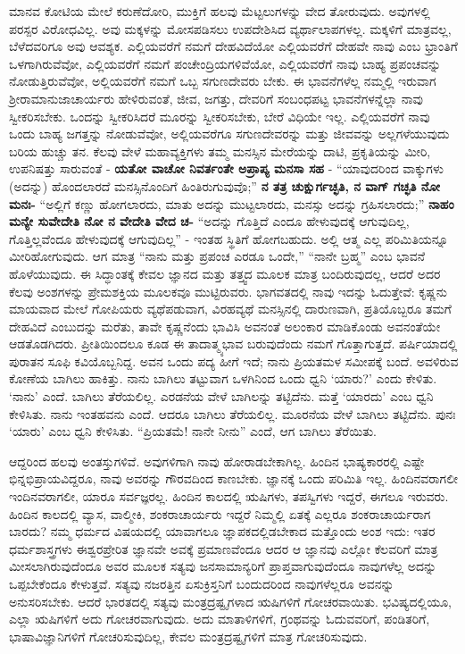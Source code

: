 ಮಾನವ ಕೋಟಿಯ ಮೇಲೆ ಕರುಣೆದೋರಿ, ಮುಕ್ತಿಗೆ ಹಲವು ಮೆಟ್ಟಲುಗಳನ್ನು ವೇದ ತೋರುವುದು. ಅವುಗಳಲ್ಲಿ ಪರಸ್ಪರ ವಿರೋಧವಿಲ್ಲ. ಅವು ಮಕ್ಕಳನ್ನು ಮೋಸಪಡಿಸಲು ಉಪದೇಶಿಸಿದ ವ್ಯರ್ಥಾಲಾಪಗಳಲ್ಲ. ಮಕ್ಕಳಿಗೆ ಮಾತ್ರವಲ್ಲ, ಬೆಳೆದವರಿಗೂ ಅವು ಆವಶ್ಯಕ. ಎಲ್ಲಿಯವರೆಗೆ ನಮಗೆ ದೇಹವಿದೆಯೋ ಎಲ್ಲಿಯವರೆಗೆ ದೇಹವೇ ನಾವು ಎಂಬ ಭ್ರಾಂತಿಗೆ ಒಳಗಾಗಿರುವೆವೋ, ಎಲ್ಲಿಯವರೆಗೆ ನಮಗೆ ಪಂಚೇಂದ್ರಿಯಗಳಿವೆಯೋ, ಎಲ್ಲಿಯವರೆಗೆ ನಾವು ಬಾಹ್ಯ ಪ್ರಪಂಚವನ್ನು ನೋಡುತ್ತಿರುವೆವೋ, ಅಲ್ಲಿಯವರೆಗೆ ನಮಗೆ ಒಬ್ಬ ಸಗುಣದೇವರು ಬೇಕು. ಈ ಭಾವನೆಗಳೆಲ್ಲ ನಮ್ಮಲ್ಲಿ ಇರುವಾಗ ಶ‍್ರೀರಾಮಾನುಜಾಚಾರ್ಯರು ಹೇಳಿರುವಂತೆ, ಜೀವ, ಜಗತ್ತು, ದೇವರಿಗೆ ಸಂಬಂಧಪಟ್ಟ ಭಾವನೆಗಳನ್ನೆಲ್ಲಾ ನಾವು ಸ್ವೀಕರಿಸಬೇಕು. ಒಂದನ್ನು ಸ್ವೀಕರಿಸಿದರೆ ಮೂರನ್ನು ಸ್ವೀಕರಿಸಬೇಕು, ಬೇರೆ ವಿಧಿಯೇ ಇಲ್ಲ. ಎಲ್ಲಿಯವರೆಗೆ ನಾವು ಒಂದು ಬಾಹ್ಯ ಜಗತ್ತನ್ನು ನೋಡುವೆವೋ, ಅಲ್ಲಿಯವರೆಗೂ ಸಗುಣದೇವರನ್ನು ಮತ್ತು ಜೀವವನ್ನು ಅಲ್ಲಗಳೆಯುವುದು ಬರಿಯ ಹುಚ್ಚು ತನ. ಕೆಲವು ವೇಳೆ ಮಹಾವ್ಯಕ್ತಿಗಳು ತಮ್ಮ ಮನಸ್ಸಿನ ಮೇರೆಯನ್ನು ದಾಟಿ, ಪ್ರಕೃತಿಯನ್ನು ಮೀರಿ, ಉಪನಿಷತ್ತು ಸಾರುವಂತೆ - \textbf{ಯತೋ ವಾಚೋ ನಿವರ್ತಂತೇ ಅಪ್ರಾಪ್ಯ ಮನಸಾ ಸಹ} - “ಯಾವುದರಿಂದ ವಾಕ್ಕುಗಳು (ಅದನ್ನು) ಹೊಂದಲಾರದೆ ಮನಸ್ಸಿನೊಂದಿಗೆ ಹಿಂತಿರುಗುವುವೊ;” \textbf{ನ ತತ್ರ ಚುಕ್ಷುರ್ಗಚ್ಛತಿ, ನ ವಾಗ್​ ಗಚ್ಛತಿ ನೋ ಮನಃ-} “ಅಲ್ಲಿಗೆ ಕಣ್ಣು ಹೋಗಲಾರದು, ಮಾತು ಅದನ್ನು ಮುಟ್ಟಲಾರದು, ಮನಸ್ಸು ಅದನ್ನು ಗ್ರಹಿಸಲಾರದು;” \textbf{ನಾಹಂ ಮನ್ಯೇ ಸುವೇದೇತಿ ನೋ ನ ವೇದೇತಿ ವೇದ ಚ-} “ಅದನ್ನು ಗೊತ್ತಿದೆ ಎಂದೂ ಹೇಳುವುದಕ್ಕೆ ಆಗುವುದಿಲ್ಲ, ಗೊತ್ತಿಲ್ಲವೆಂದೂ ಹೇಳುವುದಕ್ಕೆ ಆಗುವುದಿಲ್ಲ” - ಇಂತಹ ಸ್ಥಿತಿಗೆ ಹೋಗಬಹುದು. ಅಲ್ಲಿ ಆತ್ಮ ಎಲ್ಲ ಪರಿಮಿತಿಯನ್ನೂ ಮೀರಿಹೋಗುವುದು. ಆಗ ಮಾತ್ರ “ನಾನು ಮತ್ತು ಪ್ರಪಂಚ ಎರಡೂ ಒಂದೇ,” “ನಾನೇ ಬ್ರಹ್ಮ” ಎಂಬ ಭಾವನೆ ಹೊಳೆಯುವುದು. ಈ ಸಿದ್ಧಾಂತಕ್ಕೆ ಕೇವಲ ಜ್ಞಾನದ ಮತ್ತು ತತ್ತ್ವದ ಮೂಲಕ ಮಾತ್ರ ಬಂದಿರುವುದಲ್ಲ, ಆದರೆ ಅದರ ಕೆಲವು ಅಂಶಗಳನ್ನು ಪ್ರೇಮಶಕ್ತಿಯ ಮೂಲಕವೂ ಮುಟ್ಟಿರುವರು. ಭಾಗವತದಲ್ಲಿ ನಾವು ಇದನ್ನು ಓದುತ್ತೇವೆ: ಕೃಷ್ಣನು ಮಾಯವಾದ ಮೇಲೆ ಗೋಪಿಯರು ವ್ಯಥೆಪಡುವಾಗ, ವಿರಹವ್ಯಥೆ ಮನಸ್ಸಿನಲ್ಲಿ ದಾರುಣವಾಗಿ, ಪ್ರತಿಯೊಬ್ಬರೂ ತಮಗೆ ದೇಹವಿದೆ ಎಂಬುದನ್ನು ಮರೆತು, ತಾವೇ ಕೃಷ್ಣನೆಂದು ಭಾವಿಸಿ ಅವನಂತೆ ಅಲಂಕಾರ ಮಾಡಿಕೊಂಡು ಅವನಂತೆಯೇ ಆಡತೊಡಗಿದರು. ಪ್ರೀತಿಯಿಂದಲೂ ಕೂಡ ಈ ತಾದಾತ್ಮ್ಯಭಾವ ಬರುವುದೆಂದು ನಮಗೆ ಗೊತ್ತಾಗುತ್ತದೆ. ಪರ್ಷಿಯಾದಲ್ಲಿ ಪುರಾತನ ಸೂಫಿ ಕವಿಯೊಬ್ಬನಿದ್ದ. ಅವನ ಒಂದು ಪದ್ಯ ಹೀಗೆ ಇದೆ; ನಾನು ಪ್ರಿಯತಮಳ ಸಮೀಪಕ್ಕೆ ಬಂದೆ. ಅವಳಿರುವ ಕೋಣೆಯ ಬಾಗಿಲು ಹಾಕಿತ್ತು. ನಾನು ಬಾಗಿಲು ತಟ್ಟುವಾಗ ಒಳಗಿನಿಂದ ಒಂದು ಧ್ವನಿ ‘ಯಾರು?’ ಎಂದು ಕೇಳಿತು. ‘ನಾನು’ ಎಂದೆ. ಬಾಗಿಲು ತೆರೆಯಲಿಲ್ಲ. ಎರಡನೆಯ ವೇಳೆ ಬಾಗಿಲನ್ನು ತಟ್ಟಿದೆನು. ಮತ್ತೆ ‘ಯಾರದು’ ಎಂಬ ಧ್ವನಿ ಕೇಳಿಸಿತು. ನಾನು ಇಂತಹವನು ಎಂದೆ. ಆದರೂ ಬಾಗಿಲು ತೆರೆಯಲಿಲ್ಲ. ಮೂರನೆಯ ವೇಳೆ ಬಾಗಿಲು ತಟ್ಟಿದೆನು. ಪುನಃ ‘ಯಾರು’ ಎಂಬ ಧ್ವನಿ ಕೇಳಿಸಿತು. “ಪ್ರಿಯತಮೆ! ನಾನೇ ನೀನು” ಎಂದೆ, ಆಗ ಬಾಗಿಲು ತೆರೆಯಿತು.

ಆದ್ದರಿಂದ ಹಲವು ಅಂತಸ್ತುಗಳಿವೆ. ಅವುಗಳಿಗಾಗಿ ನಾವು ಹೋರಾಡಬೇಕಾಗಿಲ್ಲ. ಹಿಂದಿನ ಭಾಷ್ಯಕಾರರಲ್ಲಿ ಎಷ್ಟೇ ಭಿನ್ನಭಿಪ್ರಾಯವಿದ್ದರೂ, ನಾವು ಅವರನ್ನು ಗೌರವದಿಂದ ಕಾಣಬೇಕು. ಜ್ಞಾನಕ್ಕೆ ಒಂದು ಪರಿಮಿತಿ ಇಲ್ಲ. ಹಿಂದಿನವರಾಗಲೀ ಇಂದಿನವರಾಗಲೀ, ಯಾರೂ ಸರ್ವಜ್ಞರಲ್ಲ. ಹಿಂದಿನ ಕಾಲದಲ್ಲಿ ಋಷಿಗಳು, ತಪಸ್ವಿಗಳು ಇದ್ದರೆ, ಈಗಲೂ ಇರುವರು. ಹಿಂದಿನ ಕಾಲದಲ್ಲಿ ವ್ಯಾಸ, ವಾಲ್ಮೀಕಿ, ಶಂಕರಾಚಾರ್ಯರು ಇದ್ದರೆ ನಿಮ್ಮಲ್ಲಿ ಏತಕ್ಕೆ ಎಲ್ಲರೂ ಶಂಕರಾಚಾರ್ಯರಾಗ ಬಾರದು? ನಮ್ಮ ಧರ್ಮದ ವಿಷಯದಲ್ಲಿ ಯಾವಾಗಲೂ ಜ್ಞಾಪಕದಲ್ಲಿಡಬೇಕಾದ ಮತ್ತೊಂದು ಅಂಶ ಇದು: ಇತರ ಧರ್ಮಶಾಸ್ತ್ರಗಳು ಈಶ್ವರಪ್ರೇರಿತ ಜ್ಞಾನವೇ ಅವಕ್ಕೆ ಪ್ರಮಾಣವೆಂದೂ ಆದರ ಆ ಜ್ಞಾನವು ಎಲ್ಲೋ ಕೆಲವರಿಗೆ ಮಾತ್ರ ಮೀಸಲಾಗಿರುವುದೆಂದೂ ಅವರ ಮೂಲಕ ಸತ್ಯವು ಜನಸಾಮಾನ್ಯರಿಗೆ ಪ್ರಾಪ್ತವಾಗುವುದೆಂದೂ ನಾವುಗಳೆಲ್ಲ ಅದನ್ನು ಒಪ್ಪಬೇಕೆಂದೂ ಕೇಳುತ್ತವೆ. ಸತ್ಯವು ನಜರತ್ತಿನ ಏಸುಕ್ರಿಸ್ತನಿಗೆ ಬಂದುದರಿಂದ ನಾವುಗಳೆಲ್ಲರೂ ಅವನನ್ನು ಅನುಸರಿಸಬೇಕು. ಆದರೆ ಭಾರತದಲ್ಲಿ ಸತ್ಯವು ಮಂತ್ರದ್ರಷ್ಟೃಗಳಾದ ಋಷಿಗಳಿಗೆ ಗೋಚರವಾಯಿತು. ಭವಿಷ್ಯದಲ್ಲಿಯೂ, ಎಲ್ಲಾ ಋಷಿಗಳಿಗೆ ಅದು ಗೋಚರವಾಗುವುದು. ಅದು ಮಾತಾಳಿಗಳಿಗೆ, ಗ್ರಂಥವನ್ನು ಓದುವವರಿಗೆ, ಪಂಡಿತರಿಗೆ, ಭಾಷಾವಿಜ್ಞಾನಿಗಳಿಗೆ ಗೋಚರಿಸುವುದಿಲ್ಲ, ಕೇವಲ ಮಂತ್ರದ್ರಷ್ಟೃಗಳಿಗೆ ಮಾತ್ರ ಗೋಚರಿಸುವುದು.

